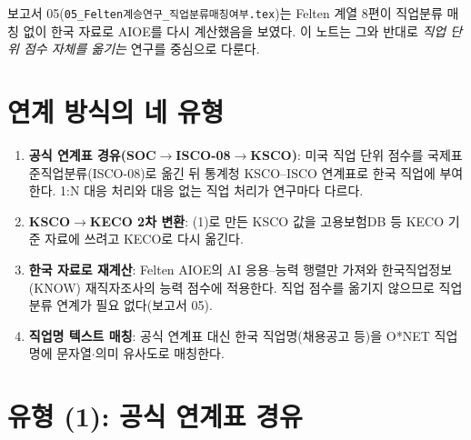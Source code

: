 \documentclass[11pt]{article}
\begin{document}
보고서 05(\texttt{05\_Felten계승연구\_직업분류매칭여부.tex})는 Felten 계열 8편이 직업분류 매칭 없이 한국 자료로 AIOE를 다시 계산했음을 보였다. 이 노트는 그와 반대로 \emph{직업 단위 점수 자체를 옮기는} 연구를 중심으로 다룬다.

\section{연계 방식의 네 유형}

\begin{enumerate}[label=(\arabic*)]
  \item \textbf{공식 연계표 경유(SOC$\to$ISCO-08$\to$KSCO)}: 미국 직업 단위 점수를 국제표준직업분류(ISCO-08)로 옮긴 뒤 통계청 KSCO–ISCO 연계표로 한국 직업에 부여한다. 1:N 대응 처리와 대응 없는 직업 처리가 연구마다 다르다.
  \item \textbf{KSCO$\to$KECO 2차 변환}: (1)로 만든 KSCO 값을 고용보험DB 등 KECO 기준 자료에 쓰려고 KECO로 다시 옮긴다.
  \item \textbf{한국 자료로 재계산}: Felten AIOE의 AI 응용–능력 행렬만 가져와 한국직업정보(KNOW) 재직자조사의 능력 점수에 적용한다. 직업 점수를 옮기지 않으므로 직업분류 연계가 필요 없다(보고서 05).
  \item \textbf{직업명 텍스트 매칭}: 공식 연계표 대신 한국 직업명(채용공고 등)을 O*NET 직업명에 문자열$\cdot$의미 유사도로 매칭한다.
\end{enumerate}

\section{유형 (1): 공식 연계표 경유}
\end{document}
